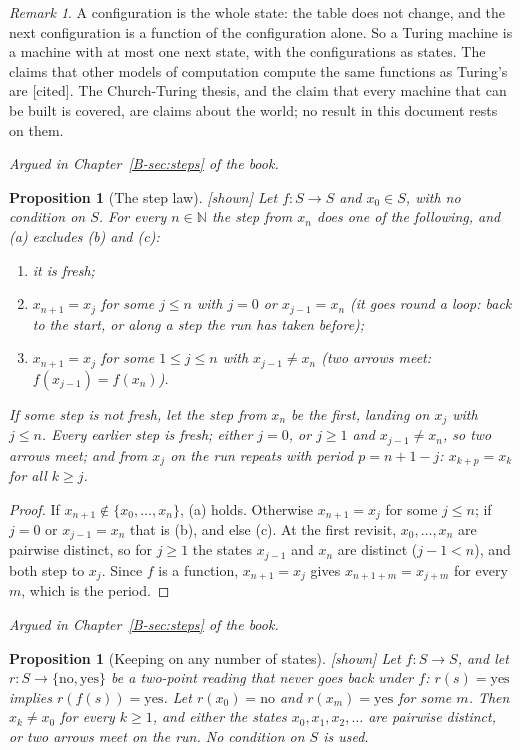 \documentclass[11pt, a4paper]{article}
\theoremstyle{plain}
\newtheorem{proposition}[theorem]{Proposition}
\theoremstyle{definition}
\theoremstyle{remark}
\newtheorem{remark}[theorem]{Remark}
\newcommand{\N}{\mathbb{N}}
\newcommand{\Bool}{\{\mathrm{no},\mathrm{yes}\}}
\newcommand{\rd}{r}
\newcommand{\argued}[1]{\par\noindent\textit{Argued in Chapter~\ref{B-#1} of the book.}\par}
\newcommand{\kind}[1]{\textup{[#1]}}
\begin{document}
\begin{remark}
A configuration is the whole state: the table does not change, and the next configuration is a
function of the configuration alone. So a Turing machine is a machine with at most one next state,
with the configurations as states. The claims that other models of computation compute the same
functions as Turing's are \kind{cited}. The Church-Turing thesis, and the claim that every machine
that can be built is covered, are claims about the world; no result in this document rests on them.
\end{remark}

\argued{sec:steps}

\begin{proposition}[The step law]\label{spec:step-law} \kind{shown}
Let $f:S\to S$ and $x_0\in S$, with no condition on $S$. For every $n\in\N$ the step from $x_n$ does
one of the following, and (a) excludes (b) and (c):
\begin{enumerate}[label=(\alph*)]
\item it is fresh;
\item $x_{n+1}=x_j$ for some $j\le n$ with $j=0$ or $x_{j-1}=x_n$ (it goes round a loop: back to the
start, or along a step the run has taken before);
\item $x_{n+1}=x_j$ for some $1\le j\le n$ with $x_{j-1}\ne x_n$ (two arrows meet:
$f(x_{j-1})=f(x_n)$).
\end{enumerate}
If some step is not fresh, let the step from $x_n$ be the first, landing on $x_j$ with $j\le n$. Every
earlier step is fresh; either $j=0$, or $j\ge 1$ and $x_{j-1}\ne x_n$, so two arrows meet; and from $x_j$
on the run repeats with period $p=n+1-j$: $x_{k+p}=x_k$ for all $k\ge j$.
\end{proposition}

\begin{proof}
If $x_{n+1}\notin\{x_0,\dots,x_n\}$, (a) holds. Otherwise $x_{n+1}=x_j$ for some $j\le n$; if $j=0$ or
$x_{j-1}=x_n$ that is (b), and else (c). At the first revisit,
$x_0,\dots,x_n$ are pairwise distinct, so for $j\ge1$ the states $x_{j-1}$ and $x_n$ are distinct
($j-1<n$), and both step to $x_j$. Since $f$ is a function, $x_{n+1}=x_j$ gives $x_{n+1+m}=x_{j+m}$ for
every $m$, which is the period.
\end{proof}

\argued{sec:steps}

\begin{proposition}[Keeping on any number of states]\label{spec:keeping-run} \kind{shown}
Let $f:S\to S$, and let $\rd:S\to\Bool$ be a two-point reading that never goes back under $f$:
$\rd(s)=\mathrm{yes}$ implies $\rd(f(s))=\mathrm{yes}$. Let $\rd(x_0)=\mathrm{no}$ and
$\rd(x_m)=\mathrm{yes}$ for some $m$. Then $x_k\ne x_0$ for every $k\ge1$, and either the states
$x_0,x_1,x_2,\dots$ are pairwise distinct, or two arrows meet on the run. No condition on $S$ is used.
\end{proposition}
\end{document}
